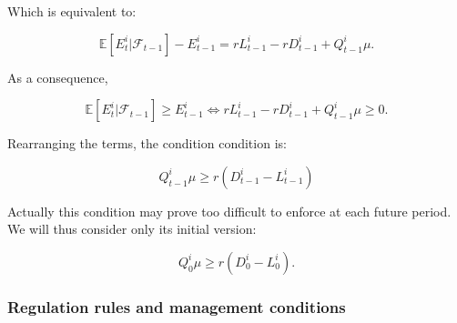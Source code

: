 \documentclass{article}
\begin{document}
Which is equivalent to:


$$\mathbb{E}[E_t ^i|\mathcal{F}_{t-1}] - E_{t-1} ^i = rL_{t-1}^i - rD_{t-1}^i + Q_{t-1}^{i} \mu.$$

As a consequence, 


$$ \mathbb{E}[E_t ^i|\mathcal{F}_{t-1}] \geq E_{t-1}^i \Leftrightarrow rL_{t-1}^i - rD_{t-1}^i + Q_{t-1}^{i} \mu \geq 0.$$

Rearranging the terms, the condition condition is:


$$ Q_{t-1}^{i} \mu \geq r(D_{t-1}^i - L_{t-1}^i)$$

Actually this condition may prove too difficult to enforce at each future period. We will thus consider only its initial version:


\begin{equation}\label{eq:nolosers}
Q_0^{i} \mu \geq r(D_0^i - L_0^i).
\end{equation}


\subsubsection{Regulation rules and management conditions}\label{subsub: rules and conditions}


\end{document}
